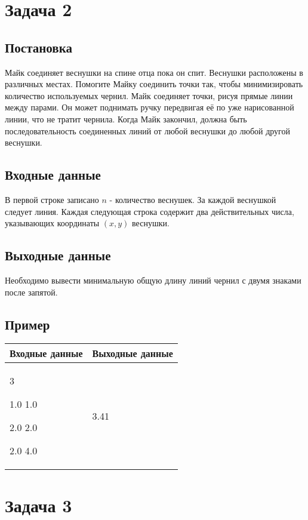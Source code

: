 \documentclass[a4]{article}
\begin{document}
\pagebreak
\section*{Задача 2}
\label{sec:orgef181bd}
\subsection*{Постановка}
\label{sec:orgad8a20e}
Майк соединяет веснушки на спине отца пока он спит. Веснушки расположены в различных местах. Помогите Майку соединить точки так, чтобы минимизировать количество
используемых чернил. Майк соединяет точки, рисуя прямые линии между парами. Он
может поднимать ручку передвигая её по уже нарисованной линии, что не тратит чернила. Когда Майк закончил, должна быть последовательность соединенных линий от любой
веснушки до любой другой веснушки.
\subsection*{Входные данные}
\label{sec:orgc51833b}
В первой строке записано \(n\) - количество веснушек. За каждой веснушкой следует линия. Каждая следующая строка содержит два действительных числа, указывающих координаты \((x, y)\) веснушки.

\subsection*{Выходные данные}
\label{sec:orgf9da829}
Необходимо вывести минимальную общую длину линий чернил с двумя знаками после запятой.
\subsection*{Пример}
\label{sec:orgd7d348d}

\begin{table}[H]
\begin{center}
\begin{tabular}{|m{4cm}|m{4cm}|}
\hline
Входные данные & Выходные данные \\ \hline
3

1.0 1.0

2.0 2.0

2.0 4.0
&
3.41
\\ \hline
\end{tabular}
\end{center}
\end{table}

\pagebreak
\section*{Задача 3}
\label{sec:org570b899}
\end{document}
